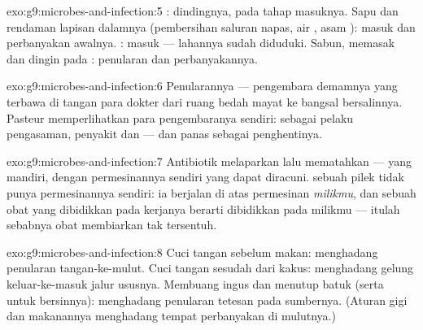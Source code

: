 \begin{solution}{exo:g9:microbes-and-infection:5}
: dindingnya, pada tahap masuknya. Sapu dan rendaman
lapisan dalamnya (pembersihan saluran napas, air , asam
): masuk dan perbanyakan awalnya. :
masuk --- lahannya sudah diduduki. Sabun, memasak dan dingin
pada : penularan dan perbanyakannya.
\end{solution}

\begin{solution}{exo:g9:microbes-and-infection:6}
Penularannya --- pengembara demamnya yang terbawa di tangan
para dokter dari ruang bedah mayat ke bangsal bersalinnya.
Pasteur memperlihatkan para pengembaranya sendiri: 
sebagai pelaku pengasaman, penyakit dan  --- dan
panas sebagai penghentinya.
\end{solution}

\begin{solution}{exo:g9:microbes-and-infection:7}
Antibiotik melaparkan lalu mematahkan  ---  yang
mandiri, dengan permesinannya sendiri yang dapat diracuni.
 sebuah pilek tidak punya permesinannya sendiri: ia
berjalan di atas permesinan \emph{milikmu}, dan sebuah obat
yang dibidikkan pada kerjanya berarti dibidikkan pada 
milikmu --- itulah sebabnya obat  membiarkan
 tak tersentuh.
\end{solution}

\begin{solution}{exo:g9:microbes-and-infection:8}
Cuci tangan sebelum makan: menghadang penularan
tangan-ke-mulut. Cuci tangan sesudah dari kakus: menghadang
gelung keluar-ke-masuk jalur ususnya. Membuang ingus dan
menutup batuk (serta  untuk bersinnya): menghadang
penularan tetesan pada sumbernya. (Aturan gigi dan makanannya
menghadang tempat perbanyakan di mulutnya.)
\end{solution}

